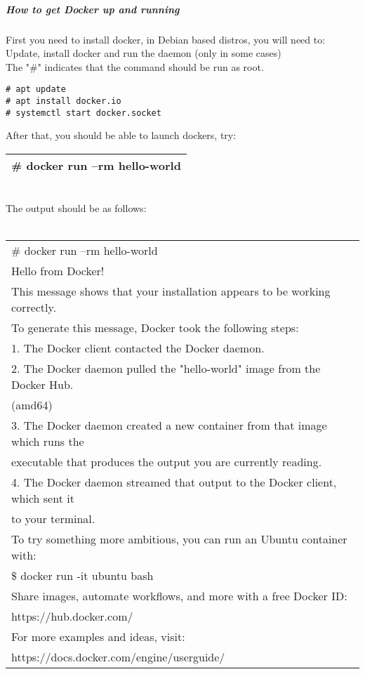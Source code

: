 \documentclass[a4paper,10pt]{article}
\begin{document}
\subparagraph{How to get Docker up and running}
First you need to install docker, in Debian based distros, you will need to:\\
Update, install docker and run the daemon (only in some cases)\\
The "\#" indicates that the command should be run as root.
\begin{verbatim}
# apt update
# apt install docker.io
# systemctl start docker.socket
\end{verbatim}
After that, you should be able to launch dockers, try:
\vspace{0.5cm}\\\begin{tabular}{|l|}\hline
\# docker run --rm hello-world
\\\hline\end{tabular}\vspace{0.5cm}\\
The output should be as follows:\\
\vspace{0.5cm}\\\begin{tabular}{|l|}\hline
\# docker run --rm hello-world\\
Hello from Docker!\\
This message shows that your installation appears to be working correctly.\\
To generate this message, Docker took the following steps:\\
 1. The Docker client contacted the Docker daemon.\\
 2. The Docker daemon pulled the "hello-world" image from the Docker Hub.\\
    (amd64)\\
 3. The Docker daemon created a new container from that image which runs the\\
    executable that produces the output you are currently reading.\\
 4. The Docker daemon streamed that output to the Docker client, which sent it\\
    to your terminal.\\
To try something more ambitious, you can run an Ubuntu container with:\\
 \$ docker run -it ubuntu bash\\
Share images, automate workflows, and more with a free Docker ID:\\
 https://hub.docker.com/\\
For more examples and ideas, visit:\\
 https://docs.docker.com/engine/userguide/\\
\hline\end{tabular}\vspace{0.5cm}\\
\end{document}
